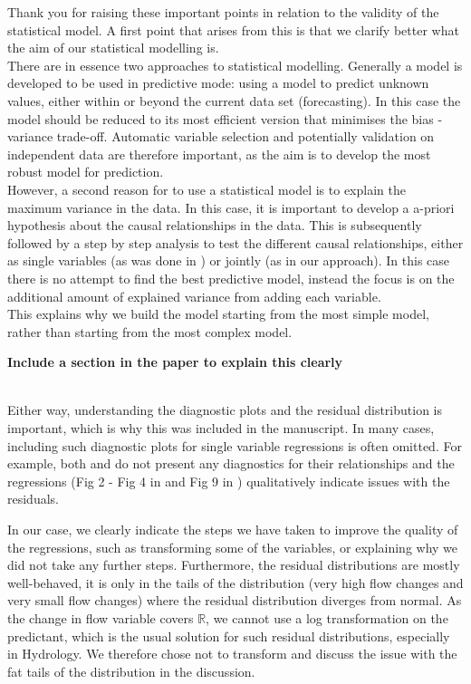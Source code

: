 \documentclass[]{elsarticle} %
\begin{document}
Thank you for raising these important points in relation to the validity of the statistical model.
A first point that arises from this is that we clarify better what the aim of our statistical modelling is.\\
There are in essence two approaches to statistical modelling. Generally a model is developed to be used in predictive mode: using a model to predict unknown values, either within or beyond the current data set (forecasting). In this case the model should be reduced to its most efficient version that minimises the bias - variance trade-off. Automatic variable selection and potentially validation on independent data are therefore important, as the aim is to develop the most robust model for prediction.\\
However, a second reason for to use a statistical model is to explain the maximum variance in the data. In this case, it is important to develop a a-priori hypothesis about the causal relationships in the data. This is subsequently followed by a step by step analysis to test the different causal relationships, either as single variables (as was done in \citet{zhang2017}) or jointly (as in our approach). In this case there is no attempt to find the best predictive model, instead the focus is on the additional amount of explained variance from adding each variable.\\
This explains why we build the model starting from the most simple model, rather than starting from the most complex model.

\hfill\break
\textbf{Include a section in the paper to explain this clearly}\\
\strut \\

Either way, understanding the diagnostic plots and the residual distribution is important, which is why this was included in the manuscript. In many cases, including such diagnostic plots for single variable regressions is often omitted. For example, both \citet{zhang2017} and \citet{filoso2017} do not present any diagnostics for their relationships and the regressions (Fig 2 - Fig 4 in \citet{zhang2017} and Fig 9 in \citet{filoso2017}) qualitatively indicate issues with the residuals.

In our case, we clearly indicate the steps we have taken to improve the quality of the regressions, such as transforming some of the variables, or explaining why we did not take any further steps. Furthermore, the residual distributions are mostly well-behaved, it is only in the tails of the distribution (very high flow changes and very small flow changes) where the residual distribution diverges from normal. As the change in flow variable covers \(\mathbb{R}\), we cannot use a log transformation on the predictant, which is the usual solution for such residual distributions, especially in Hydrology. We therefore chose not to transform and discuss the issue with the fat tails of the distribution in the discussion.
\end{document}
